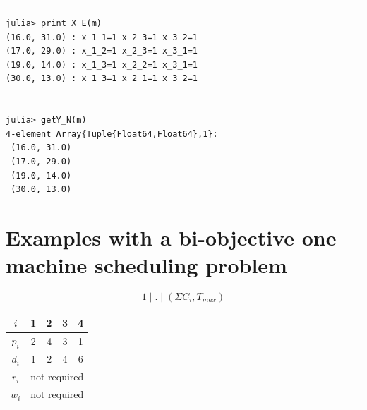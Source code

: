 \documentclass[11pt]{article}
\begin{document}
\vspace{5mm}  \vspace{2mm} \hrule

\begin{verbatim}
julia> print_X_E(m)
(16.0, 31.0) : x_1_1=1 x_2_3=1 x_3_2=1 
(17.0, 29.0) : x_1_2=1 x_2_3=1 x_3_1=1 
(19.0, 14.0) : x_1_3=1 x_2_2=1 x_3_1=1 
(30.0, 13.0) : x_1_3=1 x_2_1=1 x_3_2=1 


julia> getY_N(m)
4-element Array{Tuple{Float64,Float64},1}:
 (16.0, 31.0)
 (17.0, 29.0)
 (19.0, 14.0)
 (30.0, 13.0)
 \end{verbatim}
\break

%
%
\section{Examples with a bi-objective one machine scheduling problem}

\vspace{5mm}  \vspace{5mm} 


$$1\mid . \mid (\Sigma C_i,T_{max})$$



\vspace{15mm}  \vspace{5mm} 

\begin{table}[htp]
\begin{center}
\begin{tabular}{|c||c|c|c|c|}
\hline
$i$ & 1 & 2 & 3 & 4 \\
\hline
$p_i$  &  2 & 4 & 3  & 1 \\
\hline
$d_i$  &  1 & 2 & 4 & 6 \\
\hline
$r_i$     & \multicolumn{4}{c|}{not required}\\
\hline
$w_i$    & \multicolumn{4}{c|}{not required}\\
\hline
\end{tabular}
\end{center}
\label{default}
\end{table}%


\break

%
%
\end{document}
